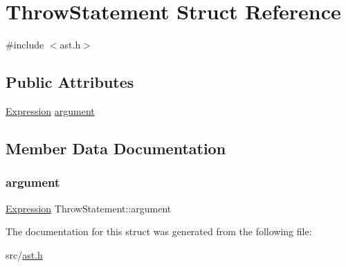 \hypertarget{struct_throw_statement}{}\section{Throw\+Statement Struct Reference}
\label{struct_throw_statement}


{\ttfamily \#include $<$ast.\+h$>$}

\subsection*{Public Attributes}
\begin{DoxyCompactItemize}
\item 
\hyperlink{ast_8h_a4cb273a4d960cd13ea17d08f254493e8}{Expression} \hyperlink{struct_throw_statement_a1bf7a60dc6ea09ea743a3e7a0a0d1751}{argument}
\end{DoxyCompactItemize}


\subsection{Member Data Documentation}
\mbox{\label{struct_throw_statement_a1bf7a60dc6ea09ea743a3e7a0a0d1751}} 
\subsubsection{\texorpdfstring{argument}{argument}}
{\footnotesize\ttfamily \hyperlink{ast_8h_a4cb273a4d960cd13ea17d08f254493e8}{Expression} Throw\+Statement\+::argument}



The documentation for this struct was generated from the following file\+:\begin{DoxyCompactItemize}
\item 
src/\hyperlink{ast_8h}{ast.\+h}\end{DoxyCompactItemize}
